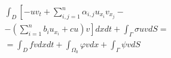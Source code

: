 \documentclass[10pt]{article}
\begin{document}
\[

\begin{gathered}

\int_{D}\left[-u v_{t}+\sum_{i, j=1}^{n} \alpha_{i, j} u_{x_{i}} v_{x_{j}}-\right. \\

\left.-\left(\sum_{i=1}^{n} b_{i} u_{x_{i}}+c u\right) v\right] d x d t+\int_{\Gamma} \sigma u v d S= \\

=\int_{D} f v d x d t+\int_{\Omega_{0}} \varphi v d x+\int_{\Gamma} \psi v d S

\end{gathered}

\]
\end{document}
